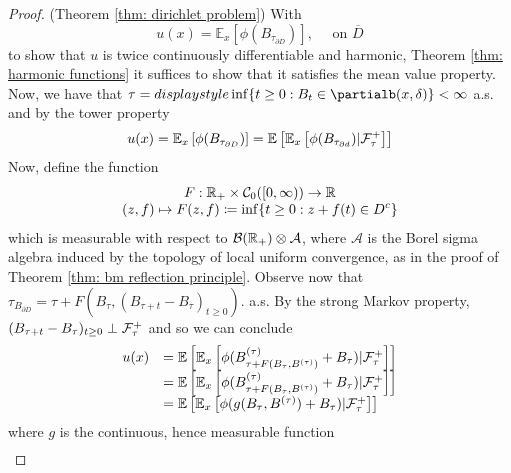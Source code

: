 \documentclass{article}
\begin{document}
\begin{proof}{(Theorem \ref{thm: dirichlet problem})}
    With 
    \[
	    u(x) = \mathbb{E}_{x}\left[ \phi(B_{\tau_{\partial D}}) \right], \quad \text{ on } \overline{D}
    \]
    to show that $ u$ is twice continuously differentiable and harmonic, Theorem \ref{thm: harmonic functions} it suffices to show that it satisfies the mean value property.\\ 

    Now, we have that $ \tau = \displaystyle\\displaystyle\inf\{t\geq 0: B_{t}\in \partialb(x, \delta)\}<\infty$ a.s. and by the tower property 
    \[
    u(x) = \mathbb{E}_{x}\left[ \phi(B_{\tau_{\partial D}}) \right] = \mathbb{E}\left[ \mathbb{E}_{x}\left[ \phi(B_{\tau_{\partial d}}) | \mathcal{F}^{+}_{\tau}\right] \right]
    \]
   Now, define the function 
   \[
	   \begin{array}{cc}
       
F : \mathbb{R}_{+}\times \mathcal{C}_{0}([0,\infty))\to \mathbb{R} \\ 
(z, f)\mapsto F(z,f)\coloneqq \displaystyle\inf\{t\geq 0: z + f(t) \in D^{c}\}
   \end{array}
   \]
   which is measurable with respect to $ \mathcal{B}(\mathbb{R}_{+}) \otimes \mathcal{A}$, where $ \mathcal{A}$ is the Borel sigma algebra induced by the topology of local uniform convergence, as in the proof of Theorem \ref{thm: bm reflection principle}. Observe now that $ \tau_{B_{\partial D}} = \tau + F(B_{\tau}, (B_{\tau +t}-B_{\tau})_{t\geq 0})$. a.s.  By the strong Markov property, $ (B_{\tau +t}-B_{\tau})_{t\geq 0}\perp \mathcal{F}^{+}_{\tau}$ and so we can conclude 
   \[
   \begin{array}{ll}
        u(x) &= \mathbb{E}\left[ \mathbb{E}_{x}\left[ \phi(B^{(\tau)}_{\tau + F(B_{\tau}, B^{(\tau)}) }+B_{\tau}) | \mathcal{F}^{+}_{\tau}\right] \right]
 \\
	     &= \mathbb{E}\left[ \mathbb{E}_{x}\left[ \phi(B^{(\tau)}_{\tau + F(B_{\tau}, B^{(\tau)}) }+B_{\tau}) | \mathcal{F}^{+}_{\tau}\right] \right]\\ 
	     & = \mathbb{E}\left[ \mathbb{E}_{x}\left[ \phi(g(B_{\tau}, B^{(\tau)})+B_{\tau}) | \mathcal{F}^{+}_{\tau}\right] \right]

   \end{array}
   \]
   where $ g$ is the continuous, hence measurable function 
\[
	   \begin{array}{cc}
       

\end{array}\]
\end{proof}
\end{document}

